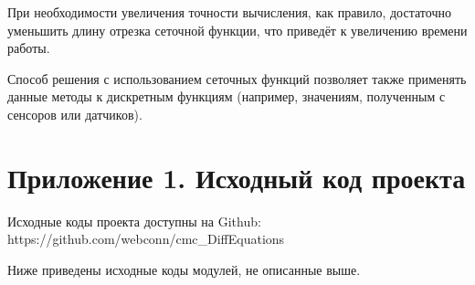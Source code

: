 \documentclass[a4paper,11pt]{report}
\begin{document}
При необходимости увеличения точности вычисления, как правило, достаточно уменьшить длину отрезка сеточной функции, что приведёт
к увеличению времени работы.

Способ решения с использованием сеточных функций позволяет также применять данные методы к дискретным функциям (например, значениям,
полученным с сенсоров или датчиков).

\newpage

\section*{Приложение 1. Исходный код проекта}

Исходные коды проекта доступны на Github: https://github.com/webconn/cmc\_DiffEquations

Ниже приведены исходные коды модулей, не описанные выше.









\end{document}
